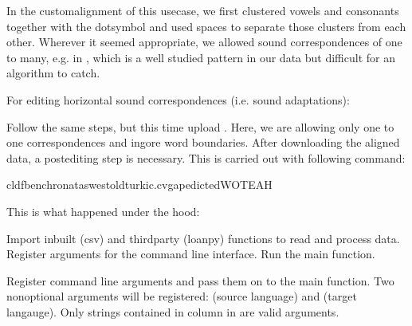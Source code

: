 \documentclass[letterpaper,10pt,english]{sphinxmanual}
\begin{document}
{{{{\begin{enumerate}
\end{enumerate}

\sphinxAtStartPar
In the custom\sphinxhyphen{}alignment of this use\sphinxhyphen{}case, we first clustered vowels and
consonants together with the dot\sphinxhyphen{}symbol and used spaces to separate those
clusters from each other. Wherever it seemed appropriate, we allowed sound
correspondences of one to many, e.g. in , which is a well studied
pattern in our data but difficult for an algorithm to catch.

\sphinxAtStartPar
For editing horizontal sound correspondences (i.e. sound adaptations):

\sphinxAtStartPar
Follow the same steps, but this time upload .
Here, we are allowing only one to one correspondences and ingore word
boundaries. After downloading the aligned data, a post\sphinxhyphen{}editing step is
necessary. This is carried out with following command:

\begin{sphinxVerbatim}[commandchars=\\\{\}]
cldfbenchronataswestoldturkic.cvgapedictedWOTEAH
\end{sphinxVerbatim}

\sphinxAtStartPar
This is what happened under the hood:

\label{\detokenize{mkedictor:module-ronataswestoldturkiccommands.cvgapedicted}}
\sphinxAtStartPar
Import inbuilt (csv) and third\sphinxhyphen{}party (loanpy) functions to read and process
data.
Register arguments for the command line interface. Run the main function.

\begin{fulllineitems}
\label{\detokenize{mkedictor:ronataswestoldturkiccommands.cvgapedicted.register}}
\pysigstartsignatures
{}
\pysigstopsignatures
\sphinxAtStartPar
Register command line arguments and pass them on to the main function.
Two non\sphinxhyphen{}optional arguments will be registered:
 (source language) and  (target langauge).
Only strings contained in column  in  are valid
arguments.


\end{fulllineitems}}}}}
\end{document}
